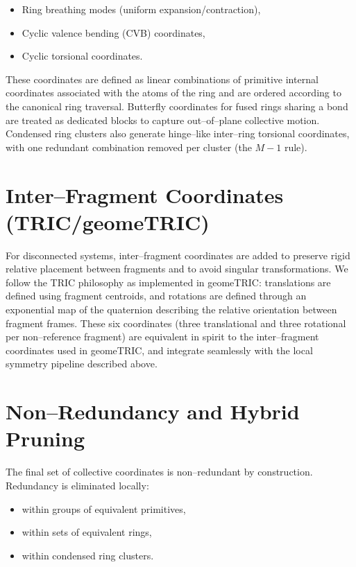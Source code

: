 \documentclass[11pt,a4paper]{article}
\begin{document}
\begin{itemize}
  \item Ring breathing modes (uniform expansion/contraction),
  \item Cyclic valence bending (CVB) coordinates,
  \item Cyclic torsional coordinates.
\end{itemize}

These coordinates are defined as linear combinations of primitive internal
coordinates associated with the atoms of the ring and are ordered according to
the canonical ring traversal.
Butterfly coordinates for fused rings sharing a bond are treated as dedicated
blocks to capture out--of--plane collective motion. Condensed ring clusters
also generate hinge--like inter--ring torsional coordinates, with one
redundant combination removed per cluster (the $M-1$ rule).

\section{Inter--Fragment Coordinates (TRIC/geomeTRIC)}

For disconnected systems, inter--fragment coordinates are added to preserve
rigid relative placement between fragments and to avoid singular transformations.
We follow the TRIC philosophy as implemented in geomeTRIC: translations are
defined using fragment centroids, and rotations are defined through an
exponential map of the quaternion describing the relative orientation between
fragment frames. These six coordinates (three translational and three rotational
per non--reference fragment) are equivalent in spirit to the inter--fragment
coordinates used in geomeTRIC, and integrate seamlessly with the local
symmetry pipeline described above.\cite{wang2016tric}

\section{Non--Redundancy and Hybrid Pruning}

The final set of collective coordinates is non--redundant by construction.
Redundancy is eliminated locally:
\begin{itemize}
  \item within groups of equivalent primitives,
  \item within sets of equivalent rings,
  \item within condensed ring clusters.
\end{itemize}
\end{document}
